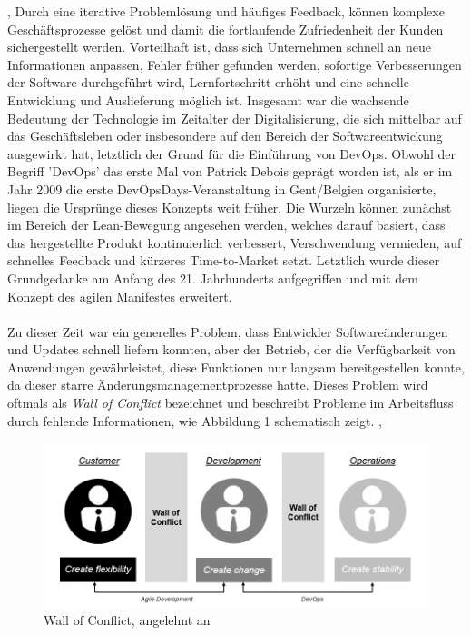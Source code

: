 \cite{bakaji_waterfall_2012}, \cite[S. 18]{ravichandran_devops_2016} Durch eine iterative Problemlösung und häufiges Feedback, können komplexe Geschäftsprozesse gelöst und damit die fortlaufende Zufriedenheit der Kunden sichergestellt werden. Vorteilhaft ist, dass sich Unternehmen schnell an neue Informationen anpassen, Fehler früher gefunden werden, sofortige Verbesserungen der Software durchgeführt wird, Lernfortschritt erhöht und eine schnelle Entwicklung und Auslieferung möglich ist. \cite[S. 18]{ravichandran_devops_2016} Insgesamt war die wachsende Bedeutung der Technologie im Zeitalter der Digitalisierung, die sich mittelbar auf das Geschäftsleben oder insbesondere auf den Bereich der Softwareentwickung ausgewirkt hat, letztlich der Grund für die Einführung von DevOps. \cite{haffke_transformative_2017} Obwohl der Begriff 'DevOps' das erste Mal von Patrick Debois geprägt worden ist, als er im Jahr 2009 die erste DevOpsDays-Veranstaltung in Gent/Belgien organisierte, liegen die Ursprünge dieses Konzepts weit früher. \cite[S.3]{kim_devops-handbuch_2017} Die Wurzeln können zunächst im Bereich der Lean-Bewegung angesehen werden, welches darauf basiert, dass das hergestellte Produkt kontinuierlich verbessert, Verschwendung vermieden, auf schnelles Feedback und kürzeres Time-to-Market setzt. \cite[S.2]{kim_devops-handbuch_2017} \cite{nelson_devops_2016} \cite[S. 11]{ravichandran_devops_2016} Letztlich wurde dieser Grundgedanke am Anfang des 21. Jahrhunderts aufgegriffen und mit dem Konzept des agilen Manifestes \cite{beck_manifesto_2001} erweitert.\\\\ Zu dieser Zeit war ein generelles Problem, dass Entwickler Softwareänderungen und Updates schnell liefern konnten, aber der Betrieb, der die Verfügbarkeit von Anwendungen gewährleistet, diese Funktionen nur langsam bereitgestellen konnte, da dieser starre Änderungsmanagementprozesse hatte. Dieses Problem wird oftmals als \textit{Wall of Conflict} bezeichnet und beschreibt Probleme im Arbeitsfluss durch fehlende Informationen, wie Abbildung 1 schematisch zeigt. \cite{kawaguchi_wall_2020}, \cite[S. 26]{huttermann_devops_2012} 

\begin{figure}[h]
    \centering
    \includegraphics[scale=0.6]{Bilder/Wall of Conflict.png}
    \caption{Wall of Conflict, angelehnt an \cite{hering_devops_2018}}
\end{figure}


